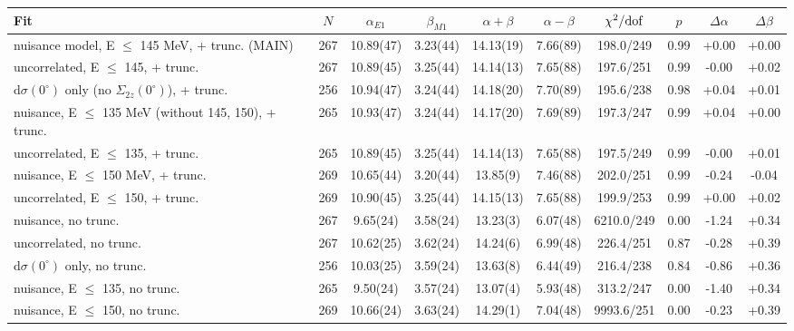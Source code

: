 \begin{tabular}{lccccccccc}
\hline
Fit & $N$ & $\alpha_{E1}$ & $\beta_{M1}$ & $\alpha+\beta$ & $\alpha-\beta$ & $\chi^2/{\rm dof}$ & $p$ & $\Delta\alpha$ & $\Delta\beta$ \\
\hline
nuisance model, E $\le$ 145 MeV, + trunc. (MAIN) & 267 & 10.89(47) & 3.23(44) & 14.13(19) & 7.66(89) & 198.0/249 & 0.99 & +0.00 & +0.00 \\
uncorrelated, E $\le$ 145, + trunc. & 267 & 10.89(45) & 3.25(44) & 14.14(13) & 7.65(88) & 197.6/251 & 0.99 & -0.00 & +0.02 \\
d$\sigma(0^\circ)$ only (no $\Sigma_{2z}(0^\circ)$), + trunc. & 256 & 10.94(47) & 3.24(44) & 14.18(20) & 7.70(89) & 195.6/238 & 0.98 & +0.04 & +0.01 \\
nuisance, E $\le$ 135 MeV (without 145, 150), + trunc. & 265 & 10.93(47) & 3.24(44) & 14.17(20) & 7.69(89) & 197.3/247 & 0.99 & +0.04 & +0.00 \\
uncorrelated, E $\le$ 135, + trunc. & 265 & 10.89(45) & 3.25(44) & 14.14(13) & 7.65(88) & 197.5/249 & 0.99 & -0.00 & +0.01 \\
nuisance, E $\le$ 150 MeV, + trunc. & 269 & 10.65(44) & 3.20(44) & 13.85(9) & 7.46(88) & 202.0/251 & 0.99 & -0.24 & -0.04 \\
uncorrelated, E $\le$ 150, + trunc. & 269 & 10.90(45) & 3.25(44) & 14.15(13) & 7.65(88) & 199.9/253 & 0.99 & +0.00 & +0.02 \\
nuisance, no trunc. & 267 & 9.65(24) & 3.58(24) & 13.23(3) & 6.07(48) & 6210.0/249 & 0.00 & -1.24 & +0.34 \\
uncorrelated, no trunc. & 267 & 10.62(25) & 3.62(24) & 14.24(6) & 6.99(48) & 226.4/251 & 0.87 & -0.28 & +0.39 \\
d$\sigma(0^\circ)$ only, no trunc. & 256 & 10.03(25) & 3.59(24) & 13.63(8) & 6.44(49) & 216.4/238 & 0.84 & -0.86 & +0.36 \\
nuisance, E $\le$ 135, no trunc. & 265 & 9.50(24) & 3.57(24) & 13.07(4) & 5.93(48) & 313.2/247 & 0.00 & -1.40 & +0.34 \\
nuisance, E $\le$ 150, no trunc. & 269 & 10.66(24) & 3.63(24) & 14.29(1) & 7.04(48) & 9993.6/251 & 0.00 & -0.23 & +0.39 \\
\hline
\end{tabular}

